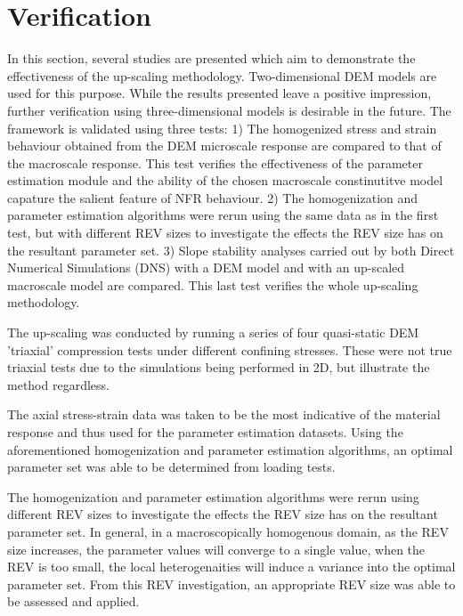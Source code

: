 \section{Verification}

In this section, several studies are presented which aim to demonstrate the effectiveness of the up-scaling methodology. Two-dimensional DEM models are used for this purpose. While the results presented leave a positive impression, further verification using three-dimensional models is desirable in the future. The framework is validated using three tests: 1) The homogenized stress and strain behaviour obtained from the DEM microscale response are compared to that of the macroscale response. This test verifies the effectiveness of the parameter estimation module and the ability of the chosen macroscale constinutitve model capature the salient feature of NFR behaviour. 2) The homogenization and parameter estimation algorithms were rerun using the same data as in the first test, but with different REV sizes to investigate the effects the REV size has on the resultant parameter set. 3) Slope stability analyses carried out by both Direct Numerical Simulations (DNS) with a DEM model and with an up-scaled macroscale model are compared. This last test verifies the whole up-scaling methodology.

The up-scaling was conducted by running a series of four quasi-static DEM 'triaxial' compression tests under different confining stresses. These were not true triaxial tests due to the simulations being performed in 2D, but illustrate the method regardless.

The axial stress-strain data was taken to be the most indicative of the material response and thus used for the parameter estimation datasets. Using the aforementioned homogenization and parameter estimation algorithms, an optimal parameter set was able to be determined from loading tests.

The homogenization and parameter estimation algorithms were rerun using different REV sizes to investigate the effects the REV size has on the resultant parameter set. In general, in a macroscopically homogenous domain, as the REV size increases, the parameter values will converge to a single value, when the REV is too small, the local heterogenaities will induce a variance into the optimal parameter set. From this REV investigation, an appropriate REV size was able to be assessed and applied. 

